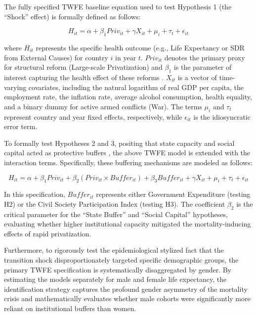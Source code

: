 \documentclass[en,magisterska]{pracamgr}
\begin{document}
The fully specified TWFE baseline equation used to test Hypothesis 1 (the ``Shock'' effect) is formally defined as follows:

\begin{equation}
H_{it}=\alpha+\beta_{1}Priv_{it}+\gamma X_{it}+\mu_{i}+\tau_{t}+\epsilon_{it}
\end{equation}

where $H_{it}$ represents the specific health outcome (e.g., Life Expectancy or SDR from External Causes) for country $i$ in year $t$. $Priv_{it}$ denotes the primary proxy for structural reform 
(Large-scale Privatization) and $\beta_{1}$ is the parameter of interest capturing the health effect of these reforms \citep{Stuckler2009, Brainerd2001}. $X_{it}$ is a vector of time-varying covariates, 
including the natural logarithm of real GDP per capita, the employment rate, the inflation rate, average alcohol consumption, health equality, and a binary dummy for active armed conflicts (War).
 The terms $\mu_{i}$ and $\tau_{t}$ represent country and year fixed effects, respectively, while $\epsilon_{it}$ is the idiosyncratic error term.

To formally test Hypotheses 2 and 3, positing that state capacity and social capital acted as protective buffers \citep{Hamm2012, Scheiring2018}, the above TWFE model is extended with the interaction 
terms. Specifically, these buffering mechanisms are modeled as follows:

\begin{equation}
H_{it}=\alpha+\beta_{1}Priv_{it}+\beta_{2}(Priv_{it}\times Buffer_{it})+\beta_{3}Buffer_{it}+\gamma X_{it}+\mu_{i}+\tau_{t}+\epsilon_{it}
\end{equation}

In this specification, $Buffer_{it}$ represents either Government Expenditure (testing H2) or the Civil Society Participation Index (testing H3). The coefficient $\beta_2$ is the critical parameter for 
the ``State Buffer'' and ``Social Capital'' hypotheses, evaluating whether higher institutional capacity mitigated the mortality-inducing effects of rapid privatization. 

Furthermore, to rigorously test the epidemiological stylized fact that the transition shock disproportionately targeted specific demographic groups, the primary TWFE specification is systematically 
disaggregated by gender. By estimating the models separately for male and female life expectancy, the identification strategy captures the profound gender asymmetry of the mortality crisis and mathematically 
evaluates whether male cohorts were significantly more reliant on institutional buffers than women.
\end{document}
